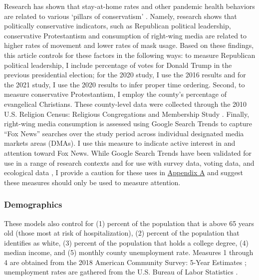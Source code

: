 Research has shown that stay-at-home rates and other pandemic health behaviors
are related to various `pillars of conservatism'
\citep{gonzalez_etal21,hillBloodChristCompels2020,hillLoveThyAged2021,
hillNastiestQuestion}. Namely, research shows that politically conservative
indicators, such as Republican political leadership, conservative Protestantism
and consumption of right-wing media are related to higher rates of movement and
lower rates of mask usage. Based on these findings, this article controls for
these factors in the following ways: to measure Republican political leadership,
I include percentage of votes for Donald Trump in the previous presidential
election; for the 2020 study, I use the 2016 results and for the 2021 study, I
use the 2020 results to infer proper time ordering. Second, to measure
conservative Protestantism, I employ the county's percentage of evangelical
Christians. These county-level data were collected through the 2010 U.S.
Religion Census: Religious Congregations and Membership Study
\citep{grammich_etal18}. Finally, right-wing media consumption is assessed using
Google Search Trends to capture ``Fox News'' searches over the study period
across individual designated media markets areas (DMAs). I use this measure to
indicate active interest in and attention toward Fox News. While Google Search Trends
have been validated for use in a range of research contexts and for use with
survey data, voting data, and ecological data
\citep{bailPrestigeProximityPrejudice2019, reyesUsingInternetSearch2018,
scheitleGoogleInsightsSearch2011, stephensdavidowitzCostRacialAnimus2014,
swearingenGoogleInsightsSenate2014}, I provide a caution for these uses in 
\hyperlink{paper-1}{Appendix A} and suggest these measures should only be used to measure attention. 


\hypertarget{demographics}{\subsubsection{Demographics}\label{demographics}}

These models also control for (1) percent of the population that is above 65
years old (those most at risk of hospitalization), (2) percent of the population
that identifies as white, (3) percent of the population that holds a college
degree, (4) median income, and (5) monthly county unemployment rate. Measures 1
through 4 are obtained from the 2018 American Community Survey: 5-Year Estimates
\citep{uscensusbureauAmericanCommunitySurvey2018}; unemployment rates are
gathered from the U.S. Bureau of Labor Statistics \citep{labor2020a}.

